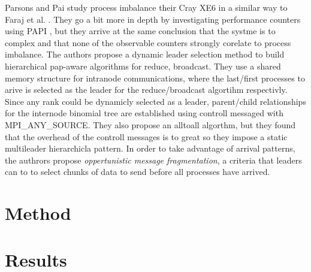 Parsons and Pai \cite{Parsons2015ExpProcImbMPICollHierarcialSys} study process imbalance their Cray XE6 in a similar way to Faraj et al. \cite{Faraj2008StudyProcArrivalMPIColl}.
They go a bit more in depth by investigating performance counters using PAPI \cite{Mucci1999PAPI}, but they arrive at the same conclusion that the systme is to complex and that none of the observable counters strongly corelate to process imbalance. 
The authors propose a dynamic leader selection method to build hierarchical pap-aware algorithms for reduce, broadcast.
They use a shared memory structure for intranode communications, where the last/first processes to arive is selected as the leader for the reduce/broadcast algortihm respectivly. 
Since any rank could be dynamicly selected as a leader, parent/child relationships for the internode binomial tree are established using controll messaged with MPI\_ANY\_SOURCE. 
They also propose an alltoall algorthm, but they found that the overhead of the controll messages is to great so they impose a static multileader hierarchicla pattern.
In order to take advantage of arrival patterns, the authrors propose \textit{oppertunistic message fragmentation}, a criteria that leaders can to to select chunks of data to send before all processes have arrived.


\section{Method}


\section{Results}

